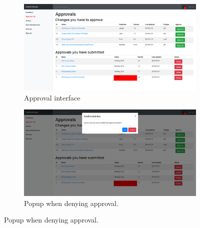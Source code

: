 \begin{figure}[H]
	\centering
	\begin{subfigure}[b]{0.48\textwidth}
		\includegraphics[width=\textwidth]{billeder/iteration1Prototyper/Approval.png}
		\caption{Approval interface}
		\label{fig:3-approve}
	\end{subfigure}
	\quad
	\begin{subfigure}[b]{0.48\textwidth}
		\includegraphics[width=\textwidth]{billeder/iteration1Prototyper/ApprovalDenial.png}
		\caption{Popup when denying approval.}
		\label{fig:3-ApproveDenial}
	\end{subfigure}
\end{figure}
